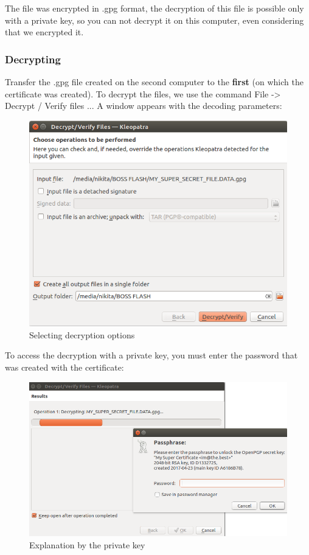 \documentclass[14pt,a4paper,report]{report}
\begin{document}
The file was encrypted in .gpg format, the decryption of this file is possible only with a private key, so you can not decrypt it on this computer, even considering that we encrypted it.

\subsubsection{Decrypting}

Transfer the .gpg file created on the second computer to the \textbf{first} (on which the certificate was created). To decrypt the files, we use the command File -> Decrypt / Verify files ... A window appears with the decoding parameters:

\begin{figure}[h!]
	\centering
	\includegraphics[scale = 0.48]{images/3_1.png}
	\caption{Selecting decryption options}
\end{figure}

To access the decryption with a private key, you must enter the password that was created with the certificate:

\begin{figure}[h!]
	\centering
	\includegraphics[scale = 0.48]{images/3_2.png}
	\caption{Explanation by the private key}
\end{figure}
\end{document}

